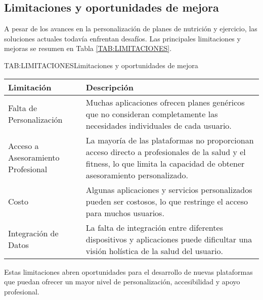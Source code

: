 \subsection{Limitaciones y oportunidades de mejora}

A pesar de los avances en la personalización de planes de nutrición y ejercicio, las soluciones actuales todavía enfrentan desafíos. Las principales limitaciones y mejoras se resumen en Tabla \ref{TAB:LIMITACIONES}.

\begin{table}[Limitaciones y Oportunidades de Mejora]{TAB:LIMITACIONES}{Limitaciones y oportunidades de mejora}
  \begin{tabular}{|p{5cm}|p{8cm}|}
    \hline
    \textbf{Limitación} & \textbf{Descripción} \\
    \hline
    Falta de Personalización & Muchas aplicaciones ofrecen planes genéricos que no consideran completamente las necesidades individuales de cada usuario. \\
    \hline
    Acceso a Asesoramiento Profesional & La mayoría de las plataformas no proporcionan acceso directo a profesionales de la salud y el fitness, lo que limita la capacidad de obtener asesoramiento personalizado. \\
    \hline
    Costo & Algunas aplicaciones y servicios personalizados pueden ser costosos, lo que restringe el acceso para muchos usuarios. \\
    \hline
    Integración de Datos & La falta de integración entre diferentes dispositivos y aplicaciones puede dificultar una visión holística de la salud del usuario. \\
    \hline
  \end{tabular}
\end{table}

Estas limitaciones abren oportunidades para el desarrollo de nuevas plataformas que puedan ofrecer un mayor nivel de personalización, accesibilidad y apoyo profesional.
